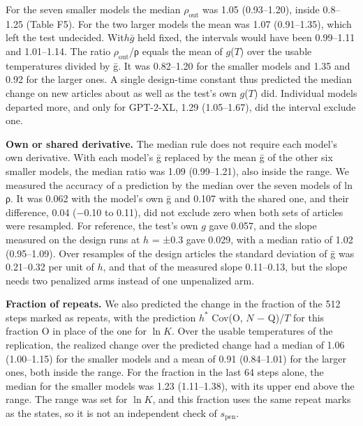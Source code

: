 \documentclass[aps,prx,onecolumn,superscriptaddress,longbibliography]{revtex4-2}
\begin{document}
For the seven smaller models the median \(\rho_{\mathrm{out}}\) was 1.05 (0.93--1.20), inside 0.8--1.25 (Table F5). For the two larger models the mean was 1.07 (0.91--1.35), which left the test undecided. Wit\(h\bar{g}\) held fixed, the intervals would have been 0.99--1.11 and 1.01--1.14. The ratio \(\rho_{\mathrm{out}}\)/ρ equals the mean of \(g\)(\(T\)) over the usable temperatures divided by ḡ. It was 0.82--1.20 for the smaller models and 1.35 and 0.92 for the larger ones. A single design-time constant thus predicted the median change on new articles about as well as the test's own \(g\)(\(T\)) did. Individual models departed more, and only for GPT-2-XL, 1.29 (1.05--1.67), did the interval exclude one.

\textbf{Own or shared derivative.} The median rule does not require each model's own derivative. With each model's ḡ replaced by the mean ḡ of the other six smaller models, the median ratio was 1.09 (0.99--1.21), also inside the range. We measured the accuracy of a prediction by the median over the seven models of \textbar ln ρ\textbar. It was 0.062 with the model's own ḡ and 0.107 with the shared one, and their difference, 0.04 (−0.10 to 0.11), did not exclude zero when both sets of articles were resampled. For reference, the test's own \(g\) gave 0.057, and the slope measured on the design runs at \(h\) = ±0.3 gave 0.029, with a median ratio of 1.02 (0.95--1.09). Over resamples of the design articles the standard deviation of ḡ was 0.21--0.32 per unit of \(h\), and that of the measured slope 0.11--0.13, but the slope needs two penalized arms instead of one unpenalized arm.

\textbf{Fraction of repeats.} We also predicted the change in the fraction of the 512 steps marked as repeats, with the prediction \(h^*\) Cov(O, \(N\) − Q)/\(T\) for this fraction O in place of the one for \(\ln K\). Over the usable temperatures of the replication, the realized change over the predicted change had a median of 1.06 (1.00--1.15) for the smaller models and a mean of 0.91 (0.84--1.01) for the larger ones, both inside the range. For the fraction in the last 64 steps alone, the median for the smaller models was 1.23 (1.11--1.38), with its upper end above the range. The range was set for \(\ln K\), and this fraction uses the same repeat marks as the states, so it is not an independent check of \(s_{\mathrm{pen}}\).
\end{document}
